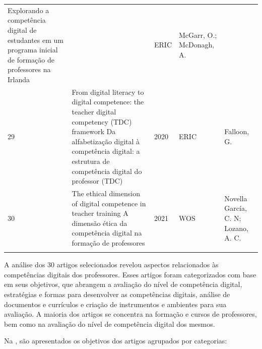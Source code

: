 \documentclass[portuguese]{textolivre}
\begin{document}
\begin{footnotesize}
\begin{longtable}{
    @{}l >{\raggedright\arraybackslash}p{}
    ll
    >{\raggedright\arraybackslash}p{}@{}
    }
Explorando a competência digital de estudantes em um programa inicial de formação de professores na Irlanda & 2021 & ERIC & McGarr, O.; McDonagh, A. \\
29 & From digital literacy to digital competence: the teacher digital competency (TDC) framework \newline
Da alfabetização digital à competência digital: a estrutura de competência digital do professor (TDC) & 2020 & ERIC & Falloon, G. \\
30 & The ethical dimension of digital competence in teacher training \newline
A dimensão ética da competência digital na formação de professores & 2021 & WOS & Novella García, C. N; Lozano, A. C. \\
\bottomrule
\source{\textcite{silva2022}.}
\end{longtable}
\end{footnotesize}

A análise dos 30 artigos selecionados revelou aspectos relacionados às
competências digitais dos professores. Esses artigos foram categorizados
com base em seus objetivos, que abrangem a avaliação do nível de
competência digital, estratégias e formas para desenvolver as
competências digitais, análise de documentos e currículos e criação de
instrumentos e ambientes para sua avaliação. A maioria dos artigos se
concentra na formação e cursos de professores, bem como na avaliação do
nível de competência digital dos mesmos.

Na , são apresentados os objetivos dos artigos agrupados por
categorias:
\end{document}
